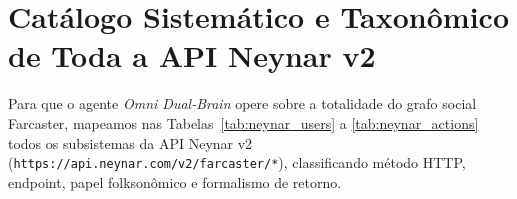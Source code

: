 \documentclass[11pt,a4paper]{article}
\begin{document}
\section{Catálogo Sistemático e Taxonômico de Toda a API Neynar v2}

Para que o agente \emph{Omni Dual-Brain} opere sobre a totalidade do grafo social Farcaster, mapeamos nas Tabelas~\ref{tab:neynar_users} a \ref{tab:neynar_actions} todos os subsistemas da API Neynar v2 (\texttt{https://api.neynar.com/v2/farcaster/*}), classificando método HTTP, endpoint, papel folksonômico e formalismo de retorno.
\end{document}
